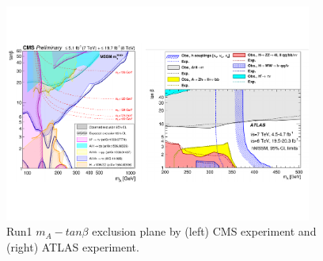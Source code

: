 \begin{figure}[htb]
\centering
	\includegraphics[width=0.9\textwidth, angle=0] {figures/MSSM_Run1.pdf}
\caption{Run1 $m_A - tan\beta$ exclusion plane by (left) CMS experiment and (right) ATLAS experiment.}
\label{fig:MSSM_Run1}   
\end{figure}
